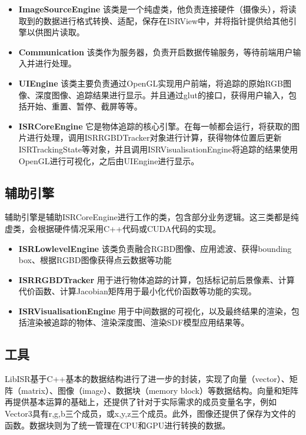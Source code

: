 \begin{itemize}
    \item \textbf{ImageSourceEngine}
该类是一个纯虚类，他负责连接硬件（摄像头），将读取到的数据进行格式转换、适配，保存在ISRView中，并将指针提供给其他引擎以供图片读取。
    
    \item \textbf{Communication}
该类作为服务器，负责开启数据传输服务，等待前端用户输入并进行处理。
    
    \item \textbf{UIEngine}
该类主要负责通过OpenGL实现用户前端，将追踪的原始RGB图像、深度图像、追踪结果进行显示。并且通过glut的接口，获得用户输入，包括开始、重置、暂停、截屏等等。

    \item \textbf{ISRCoreEngine}
它是物体追踪的核心引擎。在每一帧都会运行，将获取的图片进行处理，调用ISRRGBDTracker对象进行计算，获得物体位置后更新ISRTrackingState等对象，并且调用ISRVisualisationEngine将追踪的结果使用OpenGL进行可视化，之后由UIEngine进行显示。

\end{itemize}

\subsection{辅助引擎}

辅助引擎是辅助ISRCoreEngine进行工作的类，包含部分业务逻辑。这三类都是纯虚类，会根据硬件情况采用C++代码或CUDA\cite{CUDARef}代码的实现。

\begin{itemize}
    \item \textbf{ISRLowlevelEngine}
该类负责融合RGBD图像、应用滤波、获得bounding box、根据RGBD图像获得点云数据等功能
    
    \item \textbf{ISRRGBDTracker}
用于进行物体追踪的计算，包括标记前后景像素、计算代价函数、计算Jacobian矩阵用于最小化代价函数等功能的实现。
    
    \item \textbf{ISRVisualisationEngine}
用于中间数据的可视化，以及最终结果的渲染，包括渲染被追踪的物体、渲染深度图、渲染SDF模型应用结果等。
\end{itemize}

\subsection{工具}

LibISR基于C++基本的数据结构进行了进一步的封装，实现了向量（vector）、矩阵（matrix）、图像（image）、数据块（memory block）等数据结构。向量和矩阵再提供基本运算的基础上，还提供了针对于实际需求的成员变量名字，例如Vector3具有r,g,b三个成员，或x,y,z三个成员。此外，图像还提供了保存为文件的函数。数据块则为了统一管理在CPU和GPU进行转换的数据。